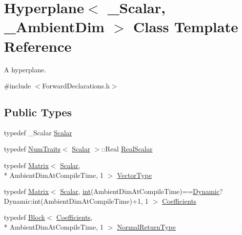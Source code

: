\hypertarget{class_hyperplane}{\section{Hyperplane$<$ \-\_\-\-Scalar, \-\_\-\-Ambient\-Dim $>$ Class Template Reference}
\label{class_hyperplane}
}


A hyperplane.  




{\ttfamily \#include $<$Forward\-Declarations.\-h$>$}

\subsection*{Public Types}
\begin{DoxyCompactItemize}
\item 
typedef \-\_\-\-Scalar \hyperlink{class_hyperplane_a7aa8093dff10cabfce189f280fb14069}{Scalar}
\item 
typedef \hyperlink{struct_num_traits}{Num\-Traits}$<$ \hyperlink{class_hyperplane_a7aa8093dff10cabfce189f280fb14069}{Scalar} $>$\-::Real \hyperlink{class_hyperplane_a4004d38aa17f44855be49535482bb2b1}{Real\-Scalar}
\item 
typedef \hyperlink{class_matrix}{Matrix}$<$ \hyperlink{class_hyperplane_a7aa8093dff10cabfce189f280fb14069}{Scalar}, \\*
Ambient\-Dim\-At\-Compile\-Time, 1 $>$ \hyperlink{class_hyperplane_ae700a24e287a31cece3618e1e1bc6385}{Vector\-Type}
\item 
typedef \hyperlink{class_matrix}{Matrix}$<$ \hyperlink{class_hyperplane_a7aa8093dff10cabfce189f280fb14069}{Scalar}, \hyperlink{ioapi_8h_a787fa3cf048117ba7123753c1e74fcd6}{int}(Ambient\-Dim\-At\-Compile\-Time)==\hyperlink{_constants_8h_adc9da5be31bdce40c25a92c27999c0e3}{Dynamic}?Dynamic\-:int(Ambient\-Dim\-At\-Compile\-Time)+1, 1 $>$ \hyperlink{class_hyperplane_ab7c2ddb9b72c5b8bbf5b754bd54b3f48}{Coefficients}
\item 
typedef \hyperlink{class_block}{Block}$<$ \hyperlink{class_hyperplane_ab7c2ddb9b72c5b8bbf5b754bd54b3f48}{Coefficients}, \\*
Ambient\-Dim\-At\-Compile\-Time, 1 $>$ \hyperlink{class_hyperplane_afe891d31b5136e497ed034c658659539}{Normal\-Return\-Type}
\end{DoxyCompactItemize}

